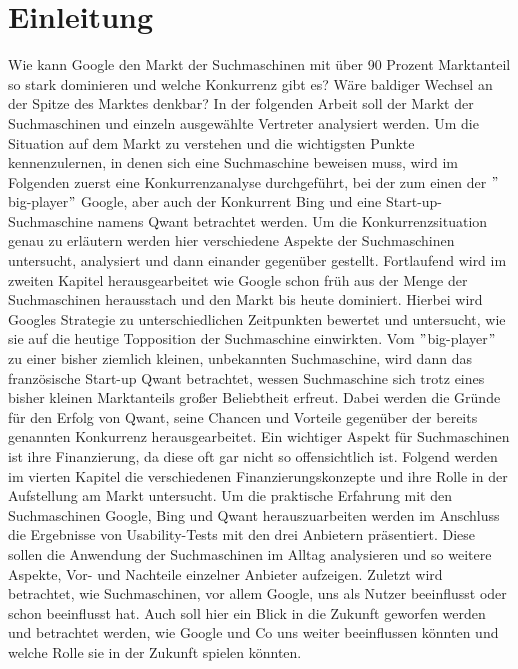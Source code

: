 \section{Einleitung}\label{sec:einleitung}
Wie kann Google den Markt der Suchmaschinen mit über 90 Prozent Marktanteil so stark dominieren und welche Konkurrenz gibt es?
Wäre baldiger Wechsel an der Spitze des Marktes denkbar?
In der folgenden Arbeit soll der Markt der Suchmaschinen und einzeln ausgewählte Vertreter analysiert werden.
Um die Situation auf dem Markt zu verstehen und die wichtigsten Punkte kennenzulernen, in denen sich eine Suchmaschine beweisen muss,
wird im Folgenden zuerst eine Konkurrenzanalyse durchgeführt, bei der zum einen der \("\)big-player\("\) Google,
aber auch der Konkurrent Bing und eine Start-up-Suchmaschine namens Qwant betrachtet werden.
Um die Konkurrenzsituation genau zu erläutern werden hier verschiedene Aspekte der Suchmaschinen untersucht, analysiert und dann einander gegenüber gestellt.
Fortlaufend wird im zweiten Kapitel herausgearbeitet wie Google schon früh aus der Menge der Suchmaschinen herausstach und den Markt bis heute dominiert.
Hierbei wird Googles Strategie zu unterschiedlichen Zeitpunkten bewertet und untersucht, wie sie auf die heutige Topposition der Suchmaschine einwirkten.
Vom \("\)big-player\("\) zu einer bisher ziemlich kleinen, unbekannten Suchmaschine,
wird dann das französische Start-up Qwant betrachtet, wessen Suchmaschine sich trotz eines bisher kleinen Marktanteils großer Beliebtheit erfreut.
Dabei werden die Gründe für den Erfolg von Qwant, seine Chancen und Vorteile gegenüber der bereits genannten Konkurrenz herausgearbeitet.
Ein wichtiger Aspekt für Suchmaschinen ist ihre Finanzierung, da diese oft gar nicht so offensichtlich ist.
Folgend werden im vierten Kapitel die verschiedenen Finanzierungskonzepte und ihre Rolle in der Aufstellung am Markt untersucht.
Um die praktische Erfahrung mit den Suchmaschinen Google, Bing und Qwant herauszuarbeiten werden im Anschluss die Ergebnisse von Usability-Tests mit den drei Anbietern präsentiert.
Diese sollen die Anwendung der Suchmaschinen im Alltag analysieren und so weitere Aspekte, Vor- und Nachteile einzelner Anbieter aufzeigen.
Zuletzt wird betrachtet, wie Suchmaschinen, vor allem Google, uns als Nutzer beeinflusst oder schon beeinflusst hat.
Auch soll hier ein Blick in die Zukunft geworfen werden und betrachtet werden, wie Google und Co uns weiter beeinflussen könnten und welche Rolle sie in der Zukunft spielen könnten.